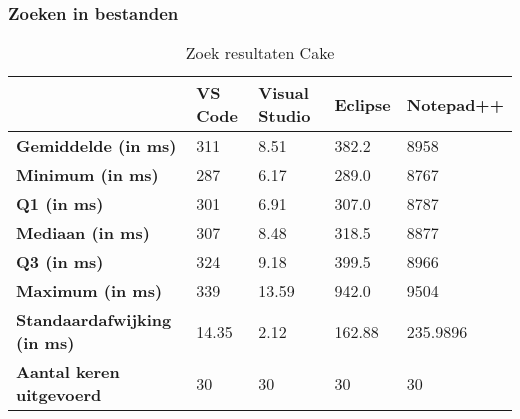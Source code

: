 \newpage

\subsubsection{Zoeken in bestanden}

\begin{table}[h]
	\centering
	\begin{tabular}{ l l l l l }
		\hline
		                                    & \textbf{VS Code} & \textbf{Visual Studio} & \textbf{Eclipse} & \textbf{Notepad++} \\
		\hline
		\textbf{Gemiddelde (in ms)}         & 311              & 8.51                   & 382.2            & 8958               \\[1ex]

		\textbf{Minimum (in ms) }           & 287              & 6.17                   & 289.0            & 8767               \\
		\textbf{Q1 (in ms)}                 & 301              & 6.91                   & 307.0            & 8787               \\
		\textbf{Mediaan (in ms)}            & 307              & 8.48                   & 318.5            & 8877               \\
		\textbf{Q3 (in ms)}                 & 324              & 9.18                   & 399.5            & 8966               \\
		\textbf{Maximum (in ms)}            & 339              & 13.59                  & 942.0            & 9504               \\[1ex]

		\textbf{Standaardafwijking (in ms)} & 14.35            & 2.12                   & 162.88           & 235.9896           \\
		\textbf{Aantal keren uitgevoerd}    & 30               & 30                     & 30               & 30                 \\
		\hline
	\end{tabular}
	\caption{Zoek resultaten Cake}
	\label{tab:resultatenSearchCake}
\end{table}

